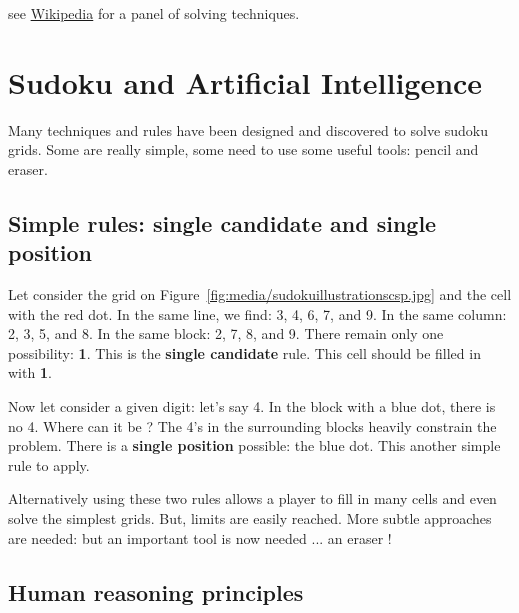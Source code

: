 \begin{note}
see \href{http://en.wikipedia.org/wiki/sudoku}{Wikipedia} for a panel of solving techniques.
\end{note}

\section{Sudoku and Artificial Intelligence}\label{sudokuandcp:sudokuandartificialintelligence}\hypertarget{sudokuandcp:sudokuandartificialintelligence}{}

Many techniques and rules have been designed and discovered to solve sudoku grids. Some are really simple, some need to use some useful tools: pencil and eraser. 

\subsection{Simple rules: single candidate and single position}\label{sudokuandcp:simplerules:singlecandidateandsingleposition}\hypertarget{sudokuandcp:simplerules:singlecandidateandsingleposition}{}


Let consider the grid on Figure~\ref{fig:media/sudokuillustrationscsp.jpg} and the cell with the red dot. In the same line, we find: 3, 4, 6, 7, and 9. In the same column: 2, 3, 5, and 8. In the same block: 2, 7, 8, and 9. There remain only one possibility: \textbf{1}. This is the \textbf{single candidate} rule. This cell should be filled in with \textbf{1}. 

Now let consider a given digit: let's say 4. In the block with a blue dot, there is no 4. Where can it be ? The 4's in the surrounding blocks heavily constrain the problem. There is a \textbf{single position} possible: the blue dot. This another simple rule to apply.

Alternatively using these two rules allows a player to fill in many cells and even solve the simplest grids. 
But, limits are easily reached. More subtle approaches are needed: but an important tool is now needed ... an eraser ! 

\subsection{Human reasoning principles}\label{sudokuandcp:humanreasoningprinciples}\hypertarget{sudokuandcp:humanreasoningprinciples}{}


